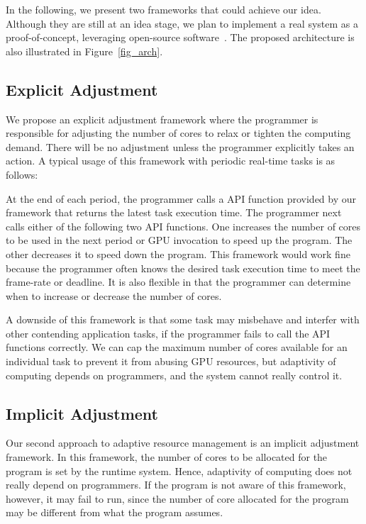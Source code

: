 \documentclass[times, 10pt, twocolumn]{article}
\begin{document}
In the following, we present two frameworks that could achieve our idea.
Although they are still at an idea stage, we plan to implement a real
system as a proof-of-concept, leveraging open-source
software~\cite{Kato_OSPERT11}. The proposed architecture is also 
illustrated in Figure~\ref{fig_arch}.

\subsection{Explicit Adjustment}

We propose an explicit adjustment framework where the programmer is
responsible for adjusting the number of cores to relax or tighten
the computing demand.
There will be no adjustment unless the programmer explicitly takes an
action.
A typical usage of this framework with periodic real-time tasks is as
follows:

At the end of each period, the programmer calls a API function provided
by our framework that returns the latest task execution time.
The programmer next calls either of the following two API functions.
One increases the number of cores to be used in the next period or GPU
invocation to speed up the program.
The other decreases it to speed down the program.
This framework would work fine because the programmer often knows the
desired task execution time to meet the frame-rate or deadline.
It is also flexible in that the programmer can determine when to
increase or decrease the number of cores.

A downside of this framework is that some task may misbehave
and interfer with other contending application tasks, if the programmer
fails to call the API functions correctly.
We can cap the maximum number of cores available for an individual task
to prevent it from abusing GPU resources, but adaptivity of computing
depends on programmers, and the system cannot really control it.

\subsection{Implicit Adjustment}

Our second approach to adaptive resource management is an implicit
adjustment framework.
In this framework, the number of cores to be allocated for the program
is set by the runtime system.
Hence, adaptivity of computing does not really depend on programmers.
If the program is not aware of this framework, however, it may fail to
run, since the number of core allocated for the program may be different
from what the program assumes.
\end{document}
